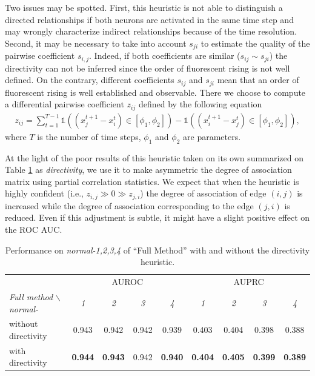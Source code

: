 \documentclass[wcp]{jmlr}
\begin{document}
Two issues may be spotted. First, this heuristic is not able to distinguish a
directed relationships if both neurons are activated in the same time step and
may wrongly characterize indirect relationships because of the time
resolution. Second, it may be necessary to take into account $s_{ji}$ to
estimate the quality of the pairwise coefficient $s_{i,j}$. Indeed, if both
coefficients are similar ($s_{ij} \sim s_{ji}$) the directivity can not be
inferred since the order of fluorescent rising is not well defined. On the
contrary, different coefficients $s_{ij}$ and $s_{ji}$ mean that an order of
fluorescent rising is well established and observable. There we choose to
compute a differential pairwise coefficient $z_{ij}$ defined by the following
equation
\begin{align}
z_{ij} = \sum_{t=1}^{T - 1}
    \mathbb{1}((x_j^{t+1} - x_i^t) \in \left[\phi_1, \phi_2 \right]) -
    \mathbb{1}((x_i^{t+1} - x_j^t) \in \left[\phi_1, \phi_2 \right]),
\end{align}
where $T$ is the number of time steps, $\phi_1$ and $\phi_2$ are parameters.

At the light of the poor results of this heuristic taken on its own summarized
on Table \ref{tab:directivity} as \textit{directivity}, we use it to make
asymmetric the degree of association matrix using partial correlation
statistics. We expect that when the heuristic is highly confident (i.e.,
$z_{i,j} \gg 0 \gg z_{j,i}$) the degree of association   of edge $(i,j)$ is
increased while the degree of association corresponding to the edge $(j,i)$ is
reduced. Even if this adjustment is subtle, it might have a slight positive
effect on the ROC AUC.

\begin{table}[ht]\label{tab:comparison}
\centering
\small
\begin{tabular}{| l | c c c c | c c c c |}
\hline
& \multicolumn{4}{c|}{AUROC} & \multicolumn{4}{c|}{AUPRC} \\
\textit{Full method} $\backslash$ \textit{normal-} & \textit{1} & \textit{2} & \textit{3} & \textit{4} & \textit{1} & \textit{2} & \textit{3} & \textit{4} \\
\hline
\hline
 without directivity & 0.943 & 0.942 & 0.942 & 0.939 & 0.403 & 0.404 & 0.398 & 0.388  \\
  with directivity  & \textbf{0.944} & \textbf{0.943} & 0.942 & \textbf{0.940} & \textbf{0.404} & \textbf{0.405} & \textbf{0.399} & \textbf{0.389}\\
\hline
\end{tabular}
\caption{Performance on \textit{normal-1,2,3,4} of ``Full Method'' with and without the directivity heuristic.}
\label{tab:directivity}
\end{table}
\end{document}

